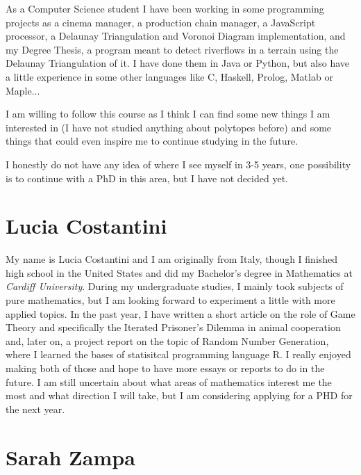 \documentclass[11pt]{amsart}
\begin{document}
As a Computer Science student I have been working in some programming projects as a cinema manager, a production chain manager, a JavaScript processor, a Delaunay Triangulation and Voronoi Diagram implementation, and my Degree Thesis, a program meant to detect riverflows in a terrain using the Delaunay Triangulation of it. I have done them in Java or Python, but also have a little experience in some other languages like C, Haskell, Prolog, Matlab or Maple...

I am willing to follow this course as I think I can find some new things I am interested in (I have not studied anything about polytopes before) and some things that could even inspire me to continue studying in the future.

I honestly do not have any idea of where I see myself in 3-5 years, one possibility is to continue with a PhD in this area, but I have not decided yet.

\medskip


\section*{Lucia Costantini}

My name is Lucia Costantini and I am originally from Italy, though I finished high school in the United States and did my Bachelor's degree in Mathematics at \textit{Cardiff University}.
During my undergraduate studies, I mainly took subjects of pure mathematics, but I am looking forward to experiment a little with more applied topics. 
In the past year, I have written a short article on the role of Game Theory and specifically the Iterated Prisoner's Dilemma in animal cooperation and, later on, a project report on the topic of Random Number Generation, where I learned the bases of statisitcal programming language R. 
I really enjoyed making both of those and hope to have more essays or reports to do in the future.
I am still uncertain about what areas of mathematics interest me the most and what direction I will take, but I am considering applying for a PHD for the next year.

\medskip 

\section*{Sarah Zampa}
\end{document}

